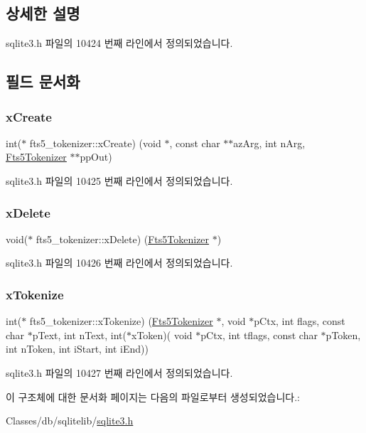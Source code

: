 \subsection{상세한 설명}


sqlite3.\+h 파일의 10424 번째 라인에서 정의되었습니다.



\subsection{필드 문서화}
\mbox{\label{structfts5__tokenizer_a61846ad000b2d38a1264c342c8201d5c}} 
\subsubsection{\texorpdfstring{x\+Create}{xCreate}}
{\footnotesize\ttfamily int($\ast$ fts5\+\_\+tokenizer\+::x\+Create) (void $\ast$, const char $\ast$$\ast$az\+Arg, int n\+Arg, \hyperlink{sqlite3_8h_ac015f88c5332d612a3125fc0014e468c}{Fts5\+Tokenizer} $\ast$$\ast$pp\+Out)}



sqlite3.\+h 파일의 10425 번째 라인에서 정의되었습니다.

\mbox{\label{structfts5__tokenizer_aaaa88b9f3e50f0b1120a05fb1bbb251f}} 
\subsubsection{\texorpdfstring{x\+Delete}{xDelete}}
{\footnotesize\ttfamily void($\ast$ fts5\+\_\+tokenizer\+::x\+Delete) (\hyperlink{sqlite3_8h_ac015f88c5332d612a3125fc0014e468c}{Fts5\+Tokenizer} $\ast$)}



sqlite3.\+h 파일의 10426 번째 라인에서 정의되었습니다.

\mbox{\label{structfts5__tokenizer_ae65ca5a9b1e6d5c1ef09731fccefa577}} 
\subsubsection{\texorpdfstring{x\+Tokenize}{xTokenize}}
{\footnotesize\ttfamily int($\ast$ fts5\+\_\+tokenizer\+::x\+Tokenize) (\hyperlink{sqlite3_8h_ac015f88c5332d612a3125fc0014e468c}{Fts5\+Tokenizer} $\ast$, void $\ast$p\+Ctx, int flags, const char $\ast$p\+Text, int n\+Text, int($\ast$x\+Token)( void $\ast$p\+Ctx, int tflags, const char $\ast$p\+Token, int n\+Token, int i\+Start, int i\+End))}



sqlite3.\+h 파일의 10427 번째 라인에서 정의되었습니다.



이 구조체에 대한 문서화 페이지는 다음의 파일로부터 생성되었습니다.\+:\begin{DoxyCompactItemize}
\item 
Classes/db/sqlitelib/\hyperlink{sqlite3_8h}{sqlite3.\+h}\end{DoxyCompactItemize}
